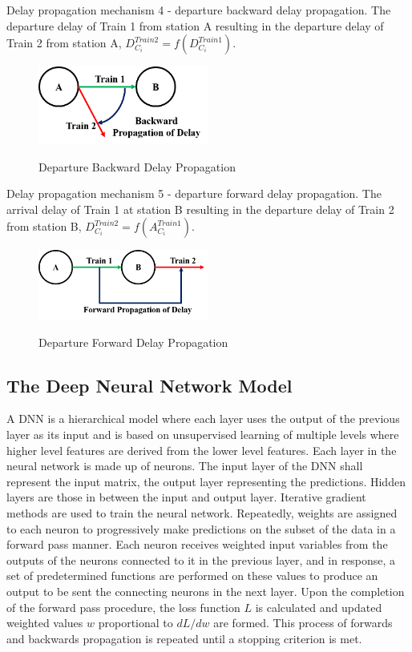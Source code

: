 \documentclass[]{interact}
\theoremstyle{plain}%
\theoremstyle{definition}
\theoremstyle{remark}
\begin{document}
Delay propagation mechanism 4 - departure backward delay propagation. The departure delay of Train 1 from station A resulting in the departure delay of Train 2 from station A, $D_{C_i}^{Train 2} = f(D_{C_i}^{Train 1})$.
\begin{figure}[H]
\centering
{%
{\includegraphics[width=0.5\textwidth]{Images/DepartureBackwardPropagation.png}}}
\caption{Departure Backward Delay Propagation} \label{DepartureBackwardPropagation}
\end{figure}

Delay propagation mechanism 5 - departure forward delay propagation. The arrival delay of Train 1 at station B resulting in the departure delay of Train 2 from station B, $D_{C_i}^{Train 2} = f(A_{C_i}^{Train 1})$.
\begin{figure}[H]
\centering
{%
{\includegraphics[width=0.5\textwidth]{Images/DepartureForwardPropagation.png}}}
\caption{Departure Forward Delay Propagation} \label{DepartureForwardPropagation}
\end{figure}

\subsection{The Deep Neural Network Model}\label{DNNSubsection}

A DNN is a hierarchical model where each layer uses the output of the previous layer as its input and is based on unsupervised learning of multiple levels where higher level features are derived from the lower level features. Each layer in the neural network is made up of neurons. The input layer of the DNN shall represent the input matrix, the output layer representing the predictions. Hidden layers are those in between the input and output layer. Iterative gradient methods are used to train the neural network. Repeatedly, weights are assigned to each neuron to progressively make predictions on the subset of the data in a forward pass manner. Each neuron receives weighted input variables from the outputs of the neurons connected to it in the previous layer, and in response, a set of predetermined functions are performed on these values to produce an output to be sent the connecting neurons in the next layer. Upon the completion of the forward pass procedure, the loss function $L$ is calculated and updated weighted values $w$ proportional to $dL/dw$ are formed. This process of forwards and backwards propagation is repeated until a stopping criterion is met.
\end{document}
